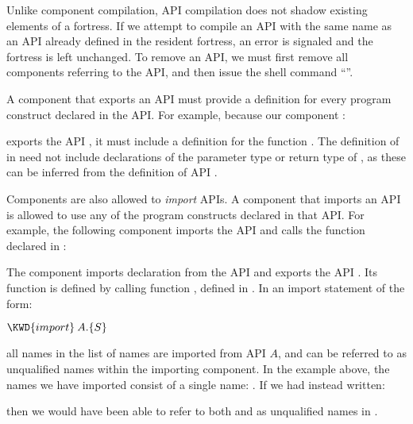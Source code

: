 

Unlike component compilation, API compilation does not shadow
existing elements of a fortress.
If we attempt to compile an API with the same name as an API
already defined
in the resident fortress, an error is signaled
and the fortress is left unchanged. To remove an API, we must
first remove all components referring to the API,
and then issue the shell command ``''.


A component that exports an API must provide a definition
for every program construct declared in the API. For example, because
our component :

exports the API , it must include a definition for the
function .
The definition of  in  need not include
declarations of the
parameter type or return type of , as these can be inferred
from the
definition of API .

Components are also allowed to \emph{import} APIs. A component that
imports an API is allowed to use any of the program constructs
declared in that API. For example, the following component imports the API
 and calls the function  declared in :


The component  imports declaration  from the API 
and exports the API
. Its  function is defined by calling function
, defined in .
In an import statement of the form:
\begin{Fortress}
\(\KWD{import}\:A.\{S\}\)
\end{Fortress}
all names in the list of names  are imported from API $A$, and can be
referred to as unqualified names within the importing component. In
the example above, the names we have imported consist of a
single name: . If we had instead written:

then we would have been able to refer to both  and 
as unqualified names in .

